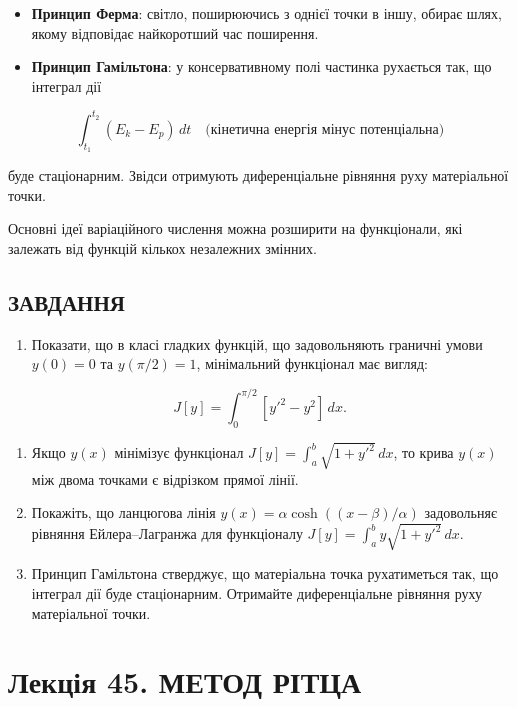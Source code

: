\documentclass[
  ukrainian,
]{article}
\providecommand{\tightlist}{%
  \setlength{\itemsep}{0pt}\setlength{\parskip}{0pt}}
\begin{document}
\begin{itemize}
\tightlist
\item
  \textbf{Принцип Ферма}: світло, поширюючись з однієї точки в іншу,
  обирає шлях, якому відповідає найкоротший час поширення.
\item
  \textbf{Принцип Гамільтона}: у консервативному полі частинка рухається
  так, що інтеграл дії
\end{itemize}

\[\int_{t_1}^{t_2} (E_k - E_p)\, dt \quad \text{(кінетична енергія мінус потенціальна)}\]

буде стаціонарним. Звідси отримують диференціальне рівняння руху
матеріальної точки.

Основні ідеї варіаційного числення можна розширити на функціонали, які
залежать від функцій кількох незалежних змінних.

\subsection{ЗАВДАННЯ}\label{ux437ux430ux432ux434ux430ux43dux43dux44f-25}

\begin{enumerate}
\def\labelenumi{\arabic{enumi}.}
\tightlist
\item
  Показати, що в класі гладких функцій, що задовольняють граничні умови
  \(y(0)=0\) та \(y(\pi/2)=1\), мінімальний функціонал має вигляд:
\end{enumerate}

\[J[y] = \int_0^{\pi/2} [y'^2 - y^2]\, dx.\]

\begin{enumerate}
\def\labelenumi{\arabic{enumi}.}
\setcounter{enumi}{1}
\item
  Якщо \(y(x)\) мінімізує функціонал
  \(J[y] = \int_a^b \sqrt{1+y'^2}\,dx\), то крива \(y(x)\) між двома
  точками є відрізком прямої лінії.
\item
  Покажіть, що ланцюгова лінія \(y(x) = \alpha\cosh((x-\beta)/\alpha)\)
  задовольняє рівняння Ейлера--Лагранжа для функціоналу
  \(J[y] = \int_a^b y\sqrt{1+y'^2}\,dx\).
\item
  Принцип Гамільтона стверджує, що матеріальна точка рухатиметься так,
  що інтеграл дії буде стаціонарним. Отримайте диференціальне рівняння
  руху матеріальної точки.
\end{enumerate}

\section{Лекція 45. МЕТОД
РІТЦА}\label{ux43bux435ux43aux446ux456ux44f-45.-ux43cux435ux442ux43eux434-ux440ux456ux442ux446ux430}
\end{document}
